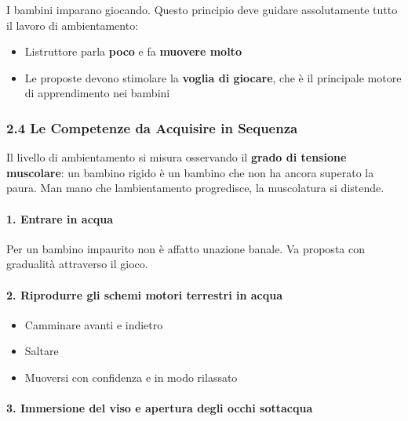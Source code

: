 \documentclass[a4paper,11pt]{article}
\providecommand{\tightlist}{%
  \setlength{\itemsep}{0pt}\setlength{\parskip}{0pt}}
\begin{document}
I bambini imparano giocando. Questo principio deve guidare assolutamente
tutto il lavoro di ambientamento:

\begin{itemize}
      \tightlist
      \item
            L\textquotesingle istruttore parla \textbf{poco} e fa \textbf{muovere
                  molto}
      \item
            Le proposte devono stimolare la \textbf{voglia di giocare}, che è il
            principale motore di apprendimento nei bambini
\end{itemize}

\subsubsection{2.4 Le Competenze da Acquisire in
      Sequenza}\label{le-competenze-da-acquisire-in-sequenza}

Il livello di ambientamento si misura osservando il \textbf{grado di
      tensione muscolare}: un bambino rigido è un bambino che non ha ancora
superato la paura. Man mano che l\textquotesingle ambientamento
progredisce, la muscolatura si distende.

\paragraph{1. Entrare in acqua}\label{entrare-in-acqua}

Per un bambino impaurito non è affatto un\textquotesingle azione banale.
Va proposta con gradualità attraverso il gioco.

\paragraph{2. Riprodurre gli schemi motori terrestri in
      acqua}\label{riprodurre-gli-schemi-motori-terrestri-in-acqua}

\begin{itemize}
      \tightlist
      \item
            Camminare avanti e indietro
      \item
            Saltare
      \item
            Muoversi con confidenza e in modo rilassato
\end{itemize}

\paragraph{3. Immersione del viso e apertura degli occhi
      sott\textquotesingle acqua}\label{immersione-del-viso-e-apertura-degli-occhi-sottacqua}
\end{document}
